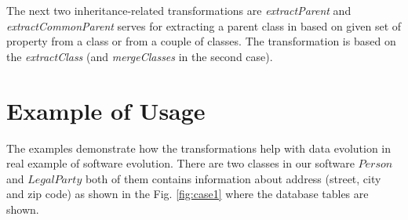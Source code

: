 \documentclass[runningheads]{comsis}
\begin{document}
The next two inheritance-related transformations are \emph{extractParent} and \emph{extractCommonParent} serves for extracting a parent class in based on given set of property from a class or from a couple of classes. The transformation is based on the \emph{extractClass} (and \emph{mergeClasses} in the second case). 




\section{Example of Usage}
The examples demonstrate how the transformations help with data evolution in real example of software evolution. There are two classes in our software $Person$ and $LegalParty$ both of them contains information about address (street, city and zip code) as shown in the Fig. \ref{fig:case1} where the database tables are shown. 
\end{document}
